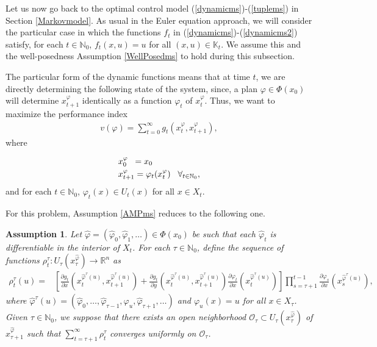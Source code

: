 \documentclass[3p]{elsarticle}
\newcommand{\rzn}{\mathbb R^{n}}
\newcommand{\nat}{\mathbb N_0}
\newtheorem{assu}[thm]{Assumption}
\begin{document}
	Let us now go back to the optimal control model (\ref{dynamicms})-(\ref{tuplems}) in Section \ref{Markovmodel}. As usual in the Euler equation approach, we will consider the particular case in which the functions $f_t$ in (\ref{dynamicms})-(\ref{dynamicms2}) satisfy, for each $t\in\nat$,  $f_t(x,u)=u$ for  all $(x,u)\in\mathbb K_t$. We assume this and the well-posedness Assumption \ref{WellPosedms} to hold during this subsection.
	
	The particular form of the dynamic functions means that at time $t$, we are directly determining the following state of the system, since, a plan $\varphi\in\varPhi(x_0)$ will determine $x_{t+1}^\varphi$ identically  as a function $\varphi_t$ of $x_t^\varphi$. Thus, we want to maximize the performance index
	\begin{align}\label{eulerpi}
	v(\varphi)=\sum_{t=0}^\infty g_t(x_t^\varphi,x_{t+1}^{\varphi}),
	\end{align}
	where
	
	\begin{align}\label{eulerdyn}
	&x_0^\varphi\hspace{0.2cm}=x_0\\
	&x_{t+1}^\varphi=\varphi_t(x_t^\varphi)\hspace{0.3cm}\forall_{t\in\nat}\label{eulerdyn2},
	\end{align}
	and for each $t\in\nat$, $\varphi_t(x)\in U_t(x)$ for all $x\in X_t$.
	
	
	For this problem, Assumption \ref{AMPms} reduces to the following one.
	\begin{assu}\label{AEE}
		Let  $\hat \varphi=(\hat \varphi_0,\hat \varphi_1,\dots) \in \varPhi(x_0)$ be such that each $\hat\varphi_t$ is differentiable in the interior of $X_t$. For each  $\tau\in\nat$, define the sequence of functions $\rho^\tau_t: U_\tau(x_\tau^{\hat\varphi})\to\rzn$ as \begin{align*}
		\rho^\tau_t(u)=&\left[  \frac{\partial g_t}{\partial x}\left( x_t^{{\hat\varphi^\tau(u)}}, x_{t+1}^{\hat{\varphi}^\tau(u)}\right) +\frac{\partial g_t}{\partial y}\left( x_t^{{\hat\varphi^\tau(u)}}, x_{t+1}^{\hat{\varphi}^\tau(u)}\right)\frac{\partial \varphi_t}{\partial x}\left( x_t^{\hat{\varphi}^\tau(u)}\right)\right]\prod_{s=\tau+1}^{t-1}\frac{\partial \varphi_s}{\partial x}\left( x_s^{\hat{\varphi}^\tau(u)}\right) ,
		\end{align*}
		where $\hat\varphi^\tau(u)=(\hat \varphi_0,\dots,\hat \varphi_{\tau-1},\varphi_u,\hat \varphi_{\tau+1},\dots)$ and $\varphi_u(x)=u$ for all $x\in X_\tau$. 
		Given $\tau\in\nat$, we suppose that there exists an open neighborhood $\mathcal O_\tau\subset U_\tau(x_\tau^{\hat\varphi})$ of $x_{\tau+1}^
		{\hat\varphi}$ such that $\displaystyle\sum_{t=\tau+1}^\infty\rho^\tau_{t}$ converges uniformly on $\mathcal O_\tau$. 
		
	\end{assu}
	
\end{document}
